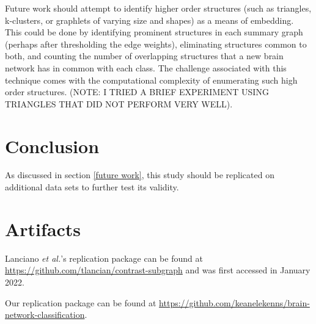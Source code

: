 \documentclass[sigconf]{acmart}
\begin{document}
Future work should attempt to identify higher order structures (such as triangles, k-clusters, or graphlets of varying size and shapes) as a means of embedding.
This could be done by identifying prominent structures in each summary graph (perhaps after thresholding the edge weights), eliminating structures common to both, and counting the number of overlapping structures that a new brain network has in common with each class.
The challenge associated with this technique comes with the computational complexity of enumerating such high order structures.
(NOTE: I TRIED A BRIEF EXPERIMENT USING TRIANGLES THAT DID NOT PERFORM VERY WELL).



\section{Conclusion}
As discussed in section \ref{future work}, this study should be replicated on additional data sets to further test its validity.

\appendix

\section{Artifacts} \label{artifacts}

Lanciano \emph{et al.}'s replication package can be found at \url{https://github.com/tlancian/contrast-subgraph} and was first accessed in January 2022.

Our replication package can be found at \url{https://github.com/keanelekenns/brain-network-classification}.



\end{document}
